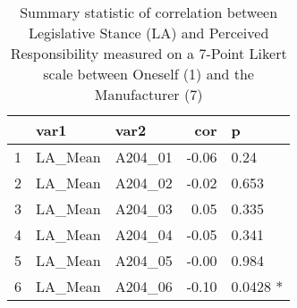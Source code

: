 \begin{table}[ht]
\centering
\begin{tabular}{rllrl}
  \hline
 & var1 & var2 & cor & p \\ 
  \hline
1 & LA\_Mean & A204\_01 & -0.06 & 0.24   \\ 
  2 & LA\_Mean & A204\_02 & -0.02 & 0.653   \\ 
  3 & LA\_Mean & A204\_03 & 0.05 & 0.335   \\ 
  4 & LA\_Mean & A204\_04 & -0.05 & 0.341   \\ 
  5 & LA\_Mean & A204\_05 & -0.00 & 0.984   \\ 
  6 & LA\_Mean & A204\_06 & -0.10 & 0.0428 * \\ 
   \hline
\end{tabular}
\caption{Summary statistic of correlation between Legislative Stance (LA) and Perceived Responsibility measured on a 7-Point Likert scale between Oneself (1) and the Manufacturer (7)} 
\end{table}
